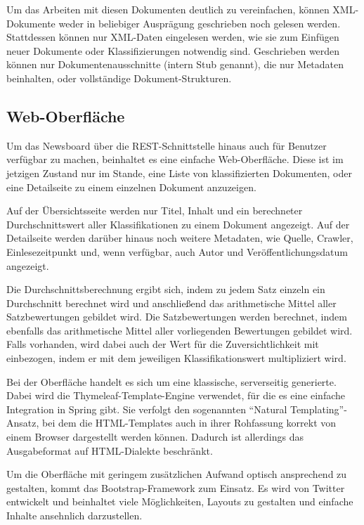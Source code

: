 Um das Arbeiten mit diesen Dokumenten deutlich zu vereinfachen, können XML-Dokumente
weder in beliebiger Ausprägung geschrieben noch gelesen werden. Stattdessen können
nur XML-Daten eingelesen werden, wie sie zum Einfügen neuer Dokumente
oder Klassifizierungen notwendig sind.
Geschrieben werden können nur Dokumentenausschnitte (intern Stub genannt),
die nur Metadaten beinhalten, oder vollständige Dokument-Strukturen.

\subsection{Web-Oberfläche}
Um das Newsboard über die REST-Schnittstelle hinaus auch für Benutzer verfügbar zu machen,
beinhaltet es eine einfache Web-Oberfläche.
Diese ist im jetzigen Zustand nur im Stande, eine Liste von klassifizierten Dokumenten,
oder eine Detailseite zu einem einzelnen Dokument anzuzeigen.

Auf der Übersichtsseite werden nur Titel, Inhalt und ein berechneter Durchschnittswert
aller Klassifikationen zu einem Dokument angezeigt. Auf der Detailseite werden
darüber hinaus noch weitere Metadaten, wie Quelle, Crawler, Einlesezeitpunkt
und, wenn verfügbar, auch Autor und Veröffentlichungsdatum angezeigt.

Die Durchschnittsberechnung ergibt sich, indem zu jedem Satz einzeln ein Durchschnitt
berechnet wird und anschließend das arithmetische Mittel aller Satzbewertungen
gebildet wird. Die Satzbewertungen werden berechnet, indem ebenfalls das arithmetische
Mittel aller vorliegenden Bewertungen gebildet wird. Falls vorhanden, wird dabei auch der
Wert für die Zuversichtlichkeit mit einbezogen, indem er mit dem jeweiligen
Klassifikationswert multipliziert wird.

Bei der Oberfläche handelt es sich um eine klassische, serverseitig generierte.
Dabei wird die Thymeleaf-Template-Engine verwendet, für die es eine einfache Integration in
Spring gibt. Sie verfolgt den sogenannten "`Natural Templating"'-Ansatz,
bei dem die HTML-Templates auch in ihrer Rohfassung korrekt von einem Browser
dargestellt werden können. Dadurch ist allerdings das Ausgabeformat
auf HTML-Dialekte beschränkt.

Um die Oberfläche mit geringem zusätzlichen Aufwand optisch ansprechend zu gestalten,
kommt das Bootstrap-Framework zum Einsatz. Es wird von Twitter entwickelt und
beinhaltet viele Möglichkeiten, Layouts zu gestalten und einfache Inhalte
ansehnlich darzustellen\cite{bootstrap}.

